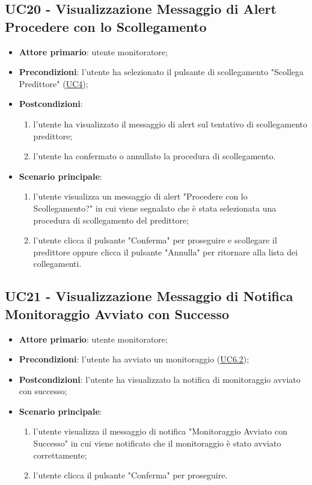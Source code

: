 	\subsection{UC20 - Visualizzazione Messaggio di Alert Procedere con lo Scollegamento}
		\begin{itemize}
			\item\textbf{Attore primario}: utente monitoratore;
			\item\textbf{Precondizioni}: l’utente ha selezionato il pulsante di scollegamento "Scollega Predittore" (\hyperref[par:UC4]{UC4});
			\item\textbf{Postcondizioni}:
				\begin{enumerate}
					\item l'utente ha visualizzato il messaggio di alert sul tentativo di scollegamento predittore;
					\item l'utente ha confermato o annullato la procedura di scollegamento.
				\end{enumerate}
			\item\textbf{Scenario principale}:
				\begin{enumerate}
					\item l’utente visualizza un messaggio di alert "Procedere con lo Scollegamento?" in cui viene segnalato che è stata selezionata una procedura di scollegamento del predittore;
					\item l'utente clicca il pulsante "Conferma" per proseguire e scollegare il predittore oppure clicca il pulsante "Annulla" per ritornare alla lista dei collegamenti.
				\end{enumerate}
		\end{itemize}	


	\label{par:UC21}
	\subsection{UC21 - Visualizzazione Messaggio di Notifica Monitoraggio Avviato con Successo}	
		\begin{itemize}
			\item\textbf{Attore primario}: utente monitoratore;
			\item\textbf{Precondizioni}: l’utente ha avviato un monitoraggio (\hyperref[par:UC6.2]{UC6.2});
			\item\textbf{Postcondizioni}: l’utente ha visualizzato la notifica di monitoraggio avviato con successo;
			\item\textbf{Scenario principale}:
				\begin{enumerate}
					\item l’utente visualizza il messaggio di notifica "Monitoraggio Avviato con Successo" in cui viene notificato che il monitoraggio è stato avviato correttamente;
					\item l'utente clicca il pulsante "Conferma" per proseguire.		
				\end{enumerate}		
		\end{itemize}

